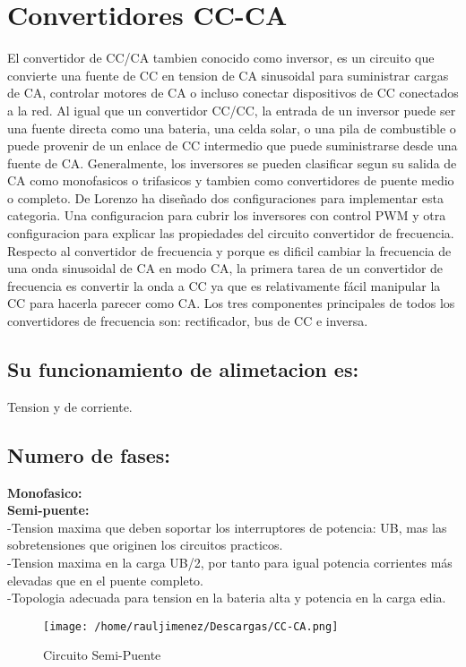 \documentclass[11pt]{article}
\title{\textbf{\begin{center}Ev-1-5-Caracteristicas De Los Convertidores De Potencia CA-CD, CD-CA, CA-CA y CD-CD\end{center}}}
\author{\textbf{Jimenez Cortes Raul}\\
\textbf{Universidad Politecnica De La Zona Metropolitana De Guadalajara}\\
		\textbf{Ingenieria Mecatronica 4º "B"}}
\date{\textbf{17/09/2019}}
\begin{document}
\maketitle

\section{Convertidores CC-CA}
El convertidor de CC/CA tambien conocido como inversor, es un circuito que convierte una fuente de CC en tension de CA sinusoidal para suministrar cargas de CA, controlar motores de CA o incluso conectar dispositivos de CC conectados a la red. Al igual que un convertidor CC/CC, la entrada de un inversor puede ser una fuente directa como una bateria, una celda solar, o una pila de combustible o puede provenir de un enlace de CC intermedio que puede suministrarse desde una fuente de CA. Generalmente, los inversores se pueden clasificar segun su salida de CA como monofasicos o trifasicos y tambien como convertidores de puente medio o completo. De Lorenzo ha diseñado dos configuraciones para implementar esta categoria. Una configuracion para cubrir los inversores con control PWM y otra configuracion para explicar las propiedades del circuito convertidor de frecuencia. Respecto al convertidor de frecuencia y porque es dificil cambiar la frecuencia de una onda sinusoidal de CA en modo CA, la primera tarea de un convertidor de frecuencia es convertir la onda a CC ya que es relativamente fácil manipular la CC para hacerla parecer como CA. Los tres componentes principales de todos los convertidores de frecuencia son: rectificador, bus de CC e inversa.
\subsection{Su funcionamiento de alimetacion es:}
Tension y de corriente.
\subsection{Numero de fases:}
\textbf{Monofasico:}\\ 
\textbf{Semi-puente:}\\
-Tension maxima que deben soportar los interruptores de potencia: UB, mas las sobretensiones que originen los circuitos practicos.\\
-Tension maxima en la carga UB/2, por tanto para igual potencia corrientes más elevadas que en el puente completo.\\
-Topologia adecuada para tension en la bateria alta y potencia en la carga edia.\\
\begin{figure}[htp]
\centering
\texttt{[image: /home/rauljimenez/Descargas/CC-CA.png]}
\caption{Circuito Semi-Puente}
\label{}
\end{figure}\\
\end{document}
